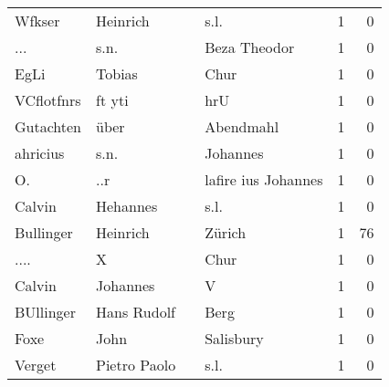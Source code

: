 \begin{tabular}{llllrr}
                   Wfkser &                           Heinrich &             &                                        s.l. &          1 &         0 \\
                      ... &                               s.n. &             &                                Beza Theodor &          1 &         0 \\
                     EgLi &                             Tobias &             &                                        Chur &          1 &         0 \\
               VCflotfnrs &                             ft yti &             &                                         hrU &          1 &         0 \\
                Gutachten &                               über &             &                                   Abendmahl &          1 &         0 \\
                 ahricius &                               s.n. &             &                                    Johannes &          1 &         0 \\
                       O. &                                ..r &             &                         lafire ius Johannes &          1 &         0 \\
                   Calvin &                           Hehannes &             &                                        s.l. &          1 &         0 \\
                Bullinger &                           Heinrich &             &                                      Zürich &          1 &        76 \\
                     .... &                                  X &             &                                        Chur &          1 &         0 \\
                   Calvin &                           Johannes &             &                                           V &          1 &         0 \\
                BUllinger &                        Hans Rudolf &             &                                        Berg &          1 &         0 \\
                     Foxe &                               John &             &                                   Salisbury &          1 &         0 \\
                   Verget &                       Pietro Paolo &             &                                        s.l. &          1 &         0 \\

\end{tabular}
